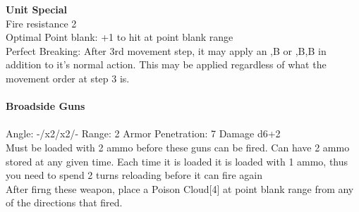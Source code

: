 {\bf Unit Special} \\
Fire resistance 2 \\ Optimal Point blank: +1 to hit at point blank range\\ Perfect Breaking: After 3rd movement step, it may apply an ,B or ,B,B in addition to it's normal action. This may be applied regardless of what the movement order at step 3 is.
\ \\
\ \\
{\bf Broadside Guns } \\
\ \\
Angle: -/x2/x2/- Range: 2 Armor Penetration: 7 Damage d6+2 \\
\indent Must be loaded with 2 ammo before these guns can be fired. Can have 2 ammo stored at any given time. Each time it is loaded it is loaded with 1 ammo, thus you need to spend 2 turns reloading before it can fire again\\ After firng these weapon, place a Poison Cloud[4] at point blank range from any of the directions that fired. \\





